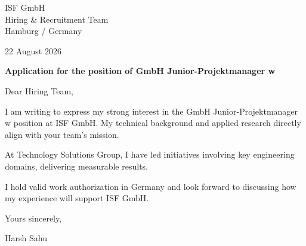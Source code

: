 \documentclass[10pt,a4paper]{article}
\begin{document}

ISF GmbH\\

Hiring \& Recruitment Team\\

Hamburg / Germany

\vspace{10pt}
22 August 2026

\vspace{10pt}
\textbf{Application for the position of GmbH Junior-Projektmanager w}


\vspace{8pt}
Dear Hiring Team,


I am writing to express my strong interest in the GmbH Junior-Projektmanager w position at ISF GmbH. My technical background and applied research directly align with your team's mission.

\vspace{4pt}

At Technology Solutions Group, I have led initiatives involving key engineering domains, delivering measurable results.

\vspace{4pt}

I hold valid work authorization in Germany and look forward to discussing how my experience will support ISF GmbH.

\vspace{4pt}


Yours sincerely,

\vspace{14pt}
Harsh Sahu
\end{document}
